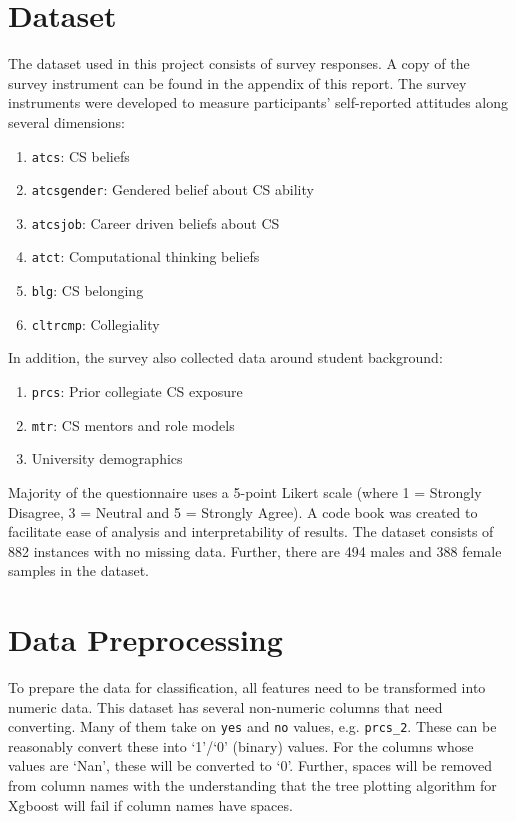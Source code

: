 \section* {Dataset}
The dataset used in this project consists of survey responses. A copy of the survey instrument can be found in the appendix of this report. The survey instruments were developed to measure participants' self-reported attitudes along several dimensions: 

\begin{enumerate}%
\item \texttt{atcs}: CS beliefs
\item \texttt{atcsgender}: Gendered belief about CS ability
\item \texttt{atcsjob}: Career driven beliefs about CS
\item \texttt{atct}: Computational thinking beliefs
\item \texttt{blg}: CS belonging
\item \texttt{cltrcmp}: Collegiality
\end{enumerate}

In addition, the survey also collected data around student background: 

\begin{enumerate}%
\item \texttt{prcs}: Prior collegiate CS exposure
\item \texttt{mtr}: CS mentors and role models
\item University demographics
\end{enumerate}



Majority of the questionnaire uses a 5-point Likert scale (where 1 = Strongly Disagree, 3 = Neutral and 5 = Strongly Agree). A code book was created to facilitate ease of analysis and interpretability of results. The dataset consists of 882 instances with no missing data. Further, there are 494 males and 388 female samples in the dataset. 




\section*{Data Preprocessing}

To prepare the data for classification, all features need to be transformed into numeric data. This dataset has several non-numeric columns that need converting. Many of them take on \texttt{yes} and \texttt{no} values, e.g. \texttt{prcs\_2}. These can be reasonably convert these into `1'/`0' (binary) values. For the columns whose values are `Nan', these will be converted to `0'. Further, spaces will be removed from column names with the understanding that the tree plotting algorithm for Xgboost will fail if column names have spaces. 

